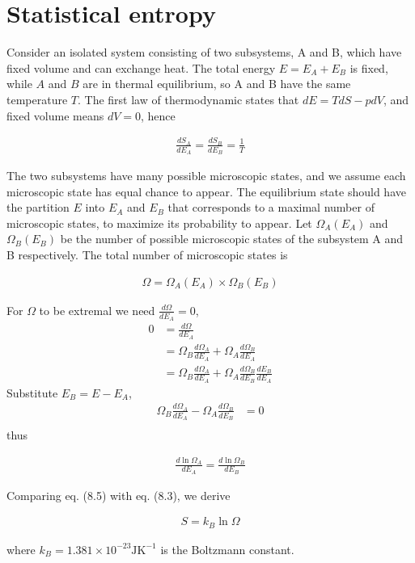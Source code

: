 \documentclass[12pt]{book} %
\numberwithin{equation}{chapter}
\def\W{\Omega}
\begin{document}
\section{Statistical entropy}
Consider an isolated system consisting of two subsystems, A and B, which have fixed volume and can exchange heat. The total energy $E=E_{A}+E_{B}$ is fixed, while $A$ and $B$ are in thermal equilibrium, so A and B have the same temperature $T$.\bigskip\newline
The first law of thermodynamic states that $dE=TdS-pdV$, and fixed volume means $dV=0$, hence
\begin{eqnbox}
\begin{align}
\frac{dS_{A}}{dE_{A}}=\frac{dS_{B}}{dE_{B}}=\frac{1}{T}
\end{align}
\end{eqnbox}
The two subsystems have many possible microscopic states, and we assume each microscopic state has equal chance to appear. The equilibrium state should have the partition $E$ into $E_{A}$ and $E_{B}$ that corresponds to a maximal number of microscopic states, to maximize its probability to appear.\bigskip\newline
Let $\W_{A}(E_{A})$ and $\W_{B}(E_{B})$ be the number of possible microscopic states of the subsystem A and B respectively. The total number of microscopic states is
\begin{eqnbox}
\begin{align}
\W=\W_{A}(E_{A})\times\W_{B}(E_{B})
\end{align}
\end{eqnbox}
For $\W$ to be extremal we need $\frac{d\W}{dE_{A}}=0$,
\begin{align*}
0&=\frac{d\W}{dE_{A}}\\
&=\W_{B}\frac{d\W_{A}}{dE_{A}}+\W_{A}\frac{d\W_{B}}{dE_{A}}\\
&=\W_{B}\frac{d\W_{A}}{dE_{A}}+\W_{A}\frac{d\W_{B}}{dE_{B}}\frac{dE_{B}}{dE_{A}}
\end{align*}
Substitute $E_{B}=E-E_{A}$,
\begin{align*}
\W_{B}\frac{d\W_{A}}{dE_{A}}-\W_{A}\frac{d\W_{B}}{dE_{B}}&=0\\
\end{align*}
thus
\begin{eqnbox}
\begin{align}
\frac{d\ln\W_{A}}{dE_{A}}=\frac{d\ln\W_{B}}{dE_{B}}
\end{align}
\end{eqnbox}
Comparing eq. (8.5) with eq. (8.3), we derive
\begin{eqnbox}
\begin{align}
S=k_{B}\ln\W
\end{align}
\end{eqnbox}
where $k_{B}=1.381\times10^{-23}\text{J}\text{K}^{-1}$ is the Boltzmann constant.
\end{document}
